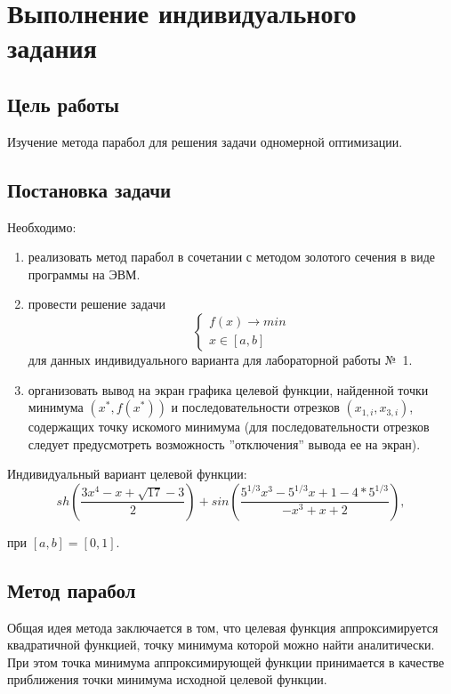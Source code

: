 \chapter{Выполнение индивидуального задания}

\section{Цель работы}

Изучение метода парабол для решения задачи одномерной оптимизации.

\section{Постановка задачи}

Необходимо:
\begin{enumerate}
\item реализовать метод парабол в сочетании с методом золотого сечения в виде программы на ЭВМ.
\item провести решение задачи
\begin{equation*}
\begin{cases}
f(x) \rightarrow min \\
x \in [a, b]
\end{cases}
\end{equation*}
для данных индивидуального варианта для лабораторной работы №~1.
\item организовать вывод на экран графика целевой функции, найденной точки минимума $(x^* , f (x^*))$ и последовательности отрезков $(x_{1,i}, x_{3,i})$, содержащих точку искомого минимума (для последовательности отрезков следует предусмотреть возможность ”отключения” вывода ее на экран).
\end{enumerate}

Индивидуальный вариант целевой функции:
\begin{equation*}
sh(\frac{3x^4 - x + \sqrt{17} - 3}{2})+sin(\frac{5^{1/3}x^3 - 5^{1/3}x + 1 - 4*5^{1/3}}{-x^3 + x + 2}),
\end{equation*}

при $[a, b] = [0, 1]$.

\newpage

\section*{Метод парабол}

Общая идея метода заключается в том, что целевая функция аппроксимируется квадратичной функцией, точку минимума которой можно найти аналитически. При этом точка минимума аппроксимирующей функции принимается в качестве приближения точки минимума исходной целевой функции. 


